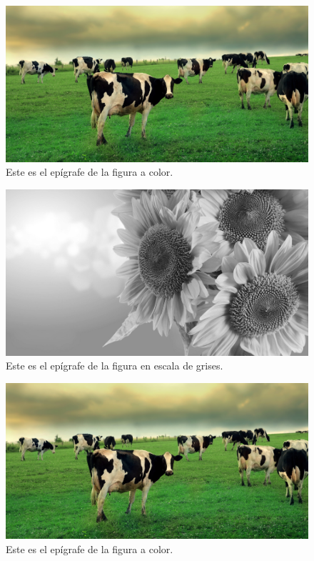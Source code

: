 \ifPDF%
\begin{figure}[!ht]
\centering
\includegraphics[width=\textwidth]{./media/imagen1.jpg}
\caption{Este es el epígrafe de la figura a color.}
\end{figure}
\else
	\ifBNPDF%
	\begin{figure}[!ht]
	\centering
	\includegraphics[width=\textwidth]{./media/bn-imagen1.png}
	\caption{Este es el epígrafe de la figura en escala de grises.}
	\end{figure}
	\else
		\ifODT%
		\begin{figure}[!ht]
		\centering
		\includegraphics[width=\textwidth]{./media/imagen1.jpg}
		\caption{Este es el epígrafe de la figura a color.}
		\end{figure}
